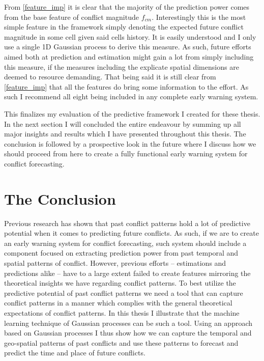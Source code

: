\documentclass[a4paper]{article}
\begin{document}
From \autoref{feature_imp} it is clear that the majority of the prediction power comes from the base feature of conflict magnitude $f_{cm}$. Interestingly this is the most simple feature in the framework simply denoting the expected future conflict magnitude in some cell given said cells history. It is easily understood and I only use a single 1D Gaussian process to derive this measure. As such, future efforts aimed both at prediction and estimation might gain a lot from simply including this measure, if the measures including the explicate spatial dimensions are deemed to resource demanding. That being said it is still clear from \autoref{feature_imp} that all the features do bring some information to the effort. As such I recommend all eight being included in any complete early warning system.\par


This finalizes my evaluation of the predictive framework I created for these thesis. In the next section I will concluded the entire endeavour by summing up all major insights and results which I have presented throughout this thesis. The conclusion is followed by a prospective look in the future where I discuss how we should proceed from here to create a fully functional early warning system for conflict forecasting.\par

\section{The Conclusion}

Previous research has shown that past conflict patterns hold a lot of predictive potential when it comes to predicting future conflicts. As such, if we are to create an early warning system for conflict forecasting, such system should include a component focused on extracting prediction power from past temporal and spatial patterns of conflict. However, previous efforts -- estimations and predictions alike -- have to a large extent failed to create features mirroring the theoretical insights we have regarding conflict patterns. To best utilize the predictive potential of past conflict patterns we need a tool that can capture conflict patterns in a manner which complies with the general theoretical expectations of conflict patterns. In this thesis I illustrate that the machine learning technique of Gaussian processes can be such a tool. Using an approach based on Gaussian processes I thus show how we can capture the temporal and geo-spatial patterns of past conflicts and use these patterns to forecast and predict the time and place of future conflicts.\par
\end{document}
